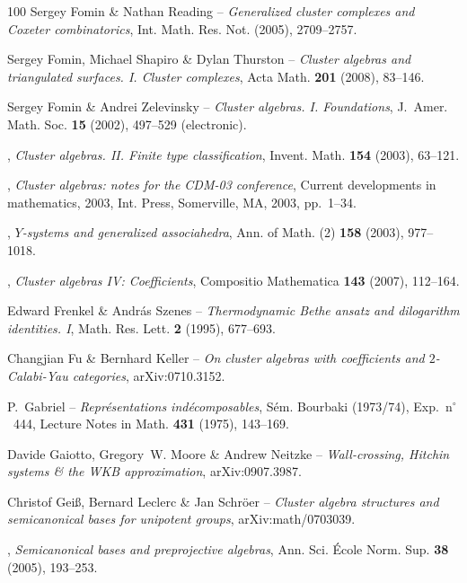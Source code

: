 \documentclass[brochure,12pt]{bourbaki}
\numberwithin{equation}{subsection}
\numberwithin{theorem}{section}
\begin{document}
\begin{thebibliography}{100}
{\sc Sergey Fomin \& Nathan Reading} -- \emph{Generalized cluster complexes and
  \mbox{{C}oxeter} combinatorics}, Int. Math. Res. Not. (2005), 2709--2757.

{\sc Sergey Fomin, Michael Shapiro \& Dylan Thurston} -- \emph{Cluster algebras and
  triangulated surfaces. {I}. {C}luster complexes}, Acta Math. \textbf{201}
  (2008), 83--146.

{\sc Sergey Fomin \& Andrei Zelevinsky} -- \emph{Cluster algebras. {I}.
  {F}oundations}, J.~Amer. Math. Soc. \textbf{15} (2002), 497--529
  (electronic).

\bysame, \emph{Cluster algebras. {II}. {F}inite type classification}, Invent.
  Math. \textbf{154} (2003), 63--121.

\bysame, \emph{Cluster algebras: notes for the {CDM}-03 conference}, Current
  developments in mathematics, 2003, Int. Press, Somerville, MA, 2003,
  pp.~1--34.

\bysame, \emph{{$Y$}-systems and generalized associahedra}, Ann. of Math. (2)
  \textbf{158} (2003), 977--1018.

\bysame, \emph{Cluster algebras {IV}: Coefficients}, Compositio Mathematica
  \textbf{143} (2007), 112--164.

{\sc Edward Frenkel \& Andr{\'a}s Szenes} -- \emph{Thermodynamic {B}ethe ansatz and
  dilogarithm identities. {I}}, Math. Res. Lett. \textbf{2} (1995), 
  677--693.

{\sc Changjian Fu \& Bernhard Keller} -- \emph{On cluster algebras with coefficients
  and $2$-{C}alabi-{Y}au categories}, arXiv:0710.3152.

{\sc P.~Gabriel} -- \emph{Repr\'esentations ind\'ecomposables}, S\'em. {B}ourbaki
(1973/74), Exp.~n$^\circ$~444, Lecture Notes in Math.  \textbf{431} (1975), 143--169.

{\sc Davide Gaiotto, Gregory~W. Moore \& Andrew Neitzke} -- \emph{Wall-crossing,
  {H}itchin systems \& the {WKB} approximation}, arXiv:0907.3987.

{\sc Christof Gei\ss, Bernard Leclerc \& Jan Schr{\"o}er} -- \emph{Cluster algebra
  structures and semicanonical bases for unipotent groups}, arXiv:math/0703039.

\bysame, \emph{Semicanonical bases and preprojective algebras}, Ann. Sci.
  \'Ecole Norm. Sup.  \textbf{38} (2005), 193--253.


\end{thebibliography}
\end{document}
